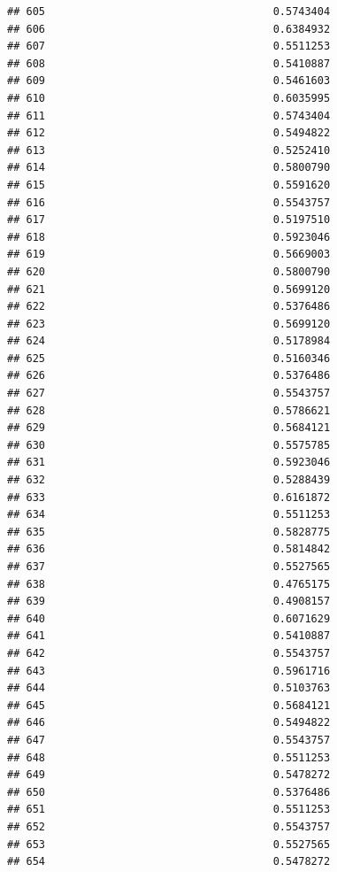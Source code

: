 \documentclass[
  american,
  man,floatsintext]{apa7}
\begin{document}
\begin{verbatim}
## 605                                    0.5743404
## 606                                    0.6384932
## 607                                    0.5511253
## 608                                    0.5410887
## 609                                    0.5461603
## 610                                    0.6035995
## 611                                    0.5743404
## 612                                    0.5494822
## 613                                    0.5252410
## 614                                    0.5800790
## 615                                    0.5591620
## 616                                    0.5543757
## 617                                    0.5197510
## 618                                    0.5923046
## 619                                    0.5669003
## 620                                    0.5800790
## 621                                    0.5699120
## 622                                    0.5376486
## 623                                    0.5699120
## 624                                    0.5178984
## 625                                    0.5160346
## 626                                    0.5376486
## 627                                    0.5543757
## 628                                    0.5786621
## 629                                    0.5684121
## 630                                    0.5575785
## 631                                    0.5923046
## 632                                    0.5288439
## 633                                    0.6161872
## 634                                    0.5511253
## 635                                    0.5828775
## 636                                    0.5814842
## 637                                    0.5527565
## 638                                    0.4765175
## 639                                    0.4908157
## 640                                    0.6071629
## 641                                    0.5410887
## 642                                    0.5543757
## 643                                    0.5961716
## 644                                    0.5103763
## 645                                    0.5684121
## 646                                    0.5494822
## 647                                    0.5543757
## 648                                    0.5511253
## 649                                    0.5478272
## 650                                    0.5376486
## 651                                    0.5511253
## 652                                    0.5543757
## 653                                    0.5527565
## 654                                    0.5478272

\end{verbatim}
\end{document}
